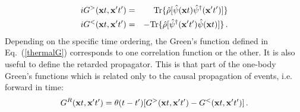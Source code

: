 \begin{eqnarray}
\label{corr_creat}
iG^>({\bf x}t, {\bf x'}t')&=& ~ ~ {\rm Tr}\{\hat{\rho}[\hat\psi({\bf x}t) \hat\psi^\dagger({\bf x'}t')]\} \\
iG^<({\bf x}t, {\bf x'}t')&=& -{\rm Tr}\{\hat{\rho}[\hat\psi^\dagger({\bf x'}t')\hat\psi({\bf x}t)]\}\,.
\label{corr_destr}
\end{eqnarray}
Depending on the specific time ordering, the Green's function defined in Eq.~(\ref{thermalG}) corresponds to one correlation function or the other. It is also useful to define the retarded propagator. This is that part of the one-body Green's functions which is related only to the causal  propagation of events, i.e. forward in time:
\begin{equation}
\label{retar_prop}
G^R({\bf x}t, {\bf x'}t')=\theta(t-t')[G^>({\bf x}t, {\bf x'}t')-G^<({\bf x}t, {\bf x'}t')]\,.
\end{equation}

